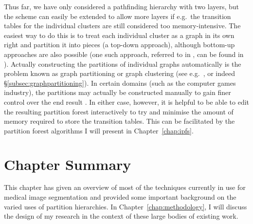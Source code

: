 Thus far, we have only considered a pathfinding hierarchy with two layers, but the scheme can easily be extended to allow more layers if e.g.~the transition tables for the individual clusters are still considered too memory-intensive. The easiest way to do this is to treat each individual cluster as a graph in its own right and partition it into pieces (a top-down approach), although bottom-up approaches are also possible (one such approach, referred to in \cite{kim98}, can be found in \cite{jing96}). Actually constructing the partitions of individual graphs automatically is the problem known as graph partitioning or graph clustering (see e.g.~\cite{huang96,jing98}, or indeed \S\ref{subsec:graphpartitioning}). In certain domains (such as the computer games industry), the partitions may actually be constructed manually to gain finer control over the end result \cite{dickheiser04}. In either case, however, it is helpful to be able to edit the resulting partition forest interactively to try and minimise the amount of memory required to store the transition tables. This can be facilitated by the partition forest algorithms I will present in Chapter~\ref{chap:ipfs}.

\section{Chapter Summary}

This chapter has given an overview of most of the techniques currently in use for medical image segmentation and provided some important background on the varied uses of partition hierarchies. In Chapter~\ref{chap:methodology}, I will discuss the design of my research in the context of these large bodies of existing work.
